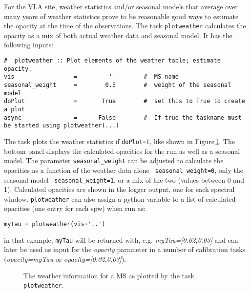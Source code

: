 For the VLA site, weather statistics and/or seasonal models that
average over many years of weather statistics prove to be reasonable good
ways to estimate the opacity at the time of the observations. The task
{\tt plotweather} calculates the opacity as a mix of both actual
weather data and seasonal model. It has the following inputs: 

\small
\begin{verbatim}
#  plotweather :: Plot elements of the weather table; estimate opacity.
vis                 =         ''        #  MS name
seasonal_weight     =        0.5        #  weight of the seasonal model
doPlot              =       True        #  set this to True to create a plot
async               =      False        #  If true the taskname must be started using plotweather(...)
\end{verbatim}
\normalsize

The task plots the weather statistics if {\tt doPlot=T}, like shown in
Figure\,\ref{fig:plotweather}. The bottom panel displays the
calculated opacities for the run as well as a seasonal model. The
parameter {\tt seasonal\_weight} can be adjusted to calculate the
opacities as a function of the weather data alone {\tt
  seasonal\_weight=0}, only the seasonal model {\tt
  seasonal\_weight=1}, or a mix of the two (values between 0 and
1). Calculated opacities are shown in the logger output, one for each
spectral window. {\tt plotweather} can also assign a python variable
to a list of calculated opacities (one entry for each spw) when run as:

\small
\begin{verbatim}
myTau = plotweather(vis='..')
\end{verbatim}
\normalsize

in that example, {\tt myTau} will be returned with, e.g. {\it
  myTau=[0.02,0.03]} and can later be used as input for the {\it
  opacity} parameter in a number of calibration tasks ({\it opacity=myTau} or {\it
  opacity=[0.02,0.03]}).


\begin{figure}[h!]
\begin{center}
\caption{\label{fig:plotweather}
The weather information for a MS as plotted by the task {\tt plotweather}.}
\hrulefill
\end{center}
\end{figure}




